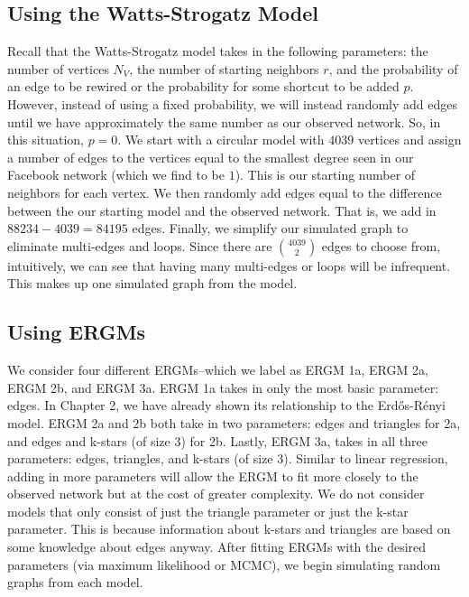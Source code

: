 \documentclass[12pt,twoside]{amherstthesis}
\begin{document}
  \subsection{Using the Watts-Strogatz
  Model}\label{using-the-watts-strogatz-model}
  
  Recall that the Watts-Strogatz model takes in the following parameters:
  the number of vertices \(N_{V}\), the number of starting neighbors
  \(r\), and the probability of an edge to be rewired or the probability
  for some shortcut to be added \(p\). However, instead of using a fixed
  probability, we will instead randomly add edges until we have
  approximately the same number as our observed network. So, in this
  situation, \(p = 0\). We start with a circular model with \(4039\)
  vertices and assign a number of edges to the vertices equal to the
  smallest degree seen in our Facebook network (which we find to be
  \(1\)). This is our starting number of neighbors for each vertex. We
  then randomly add edges equal to the difference between the our starting
  model and the observed network. That is, we add in
  \(88234 - 4039 = 84195\) edges. Finally, we simplify our simulated graph
  to eliminate multi-edges and loops. Since there are \(4039 \choose 2\)
  edges to choose from, intuitively, we can see that having many
  multi-edges or loops will be infrequent. This makes up one simulated
  graph from the model.
  
  \subsection{Using ERGMs}\label{using-ergms}
  
  We consider four different ERGMs--which we label as ERGM 1a, ERGM 2a,
  ERGM 2b, and ERGM 3a. ERGM 1a takes in only the most basic parameter:
  edges. In Chapter 2, we have already shown its relationship to the
  Erdős-Rényi model. ERGM 2a and 2b both take in two parameters: edges and
  triangles for 2a, and edges and k-stars (of size \(3\)) for 2b. Lastly,
  ERGM 3a, takes in all three parameters: edges, triangles, and k-stars
  (of size \(3\)). Similar to linear regression, adding in more parameters
  will allow the ERGM to fit more closely to the observed network but at
  the cost of greater complexity. We do not consider models that only
  consist of just the triangle parameter or just the k-star parameter.
  This is because information about k-stars and triangles are based on
  some knowledge about edges anyway. After fitting ERGMs with the desired
  parameters (via maximum likelihood or MCMC), we begin simulating random
  graphs from each model.
  
\end{document}
